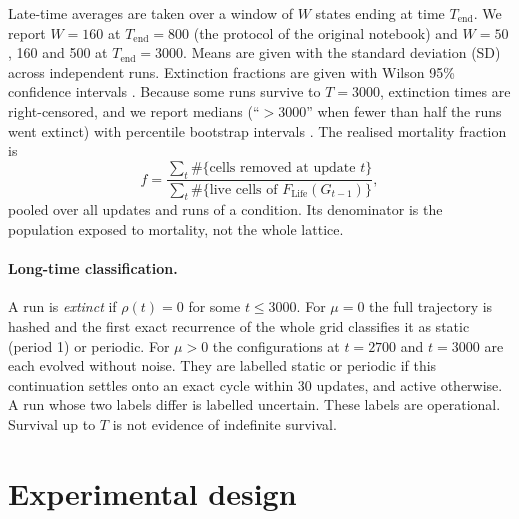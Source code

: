 \documentclass[11pt,a4paper]{article}
\newcommand{\Life}{F_{\mathrm{Life}}}
\begin{document}
Late-time averages are taken over a window of $W$ states ending at time $T_{\mathrm{end}}$. We report $W=160$ at $T_{\mathrm{end}}=800$ (the protocol of the original notebook) and $W=50$, 160 and 500 at $T_{\mathrm{end}}=3000$. Means are given with the standard deviation (SD) across independent runs. Extinction fractions are given with Wilson 95\% confidence intervals \cite{wilson1927}. Because some runs survive to $T=3000$, extinction times are right-censored, and we report medians (``$>3000$'' when fewer than half the runs went extinct) with percentile bootstrap intervals \cite{efron1979}. The realised mortality fraction is
\begin{equation}
f=\frac{\sum_t \#\{\text{cells removed at update }t\}}{\sum_t \#\{\text{live cells of }\Life(G_{t-1})\}},
\end{equation}
pooled over all updates and runs of a condition. Its denominator is the population exposed to mortality, not the whole lattice.

\paragraph{Long-time classification.} A run is \emph{extinct} if $\rho(t)=0$ for some $t\le3000$. For $\mu=0$ the full trajectory is hashed and the first exact recurrence of the whole grid classifies it as static (period 1) or periodic. For $\mu>0$ the configurations at $t=2700$ and $t=3000$ are each evolved without noise. They are labelled static or periodic if this continuation settles onto an exact cycle within 30 updates, and active otherwise. A run whose two labels differ is labelled uncertain. These labels are operational. Survival up to $T$ is not evidence of indefinite survival.

\section{Experimental design}
\end{document}
